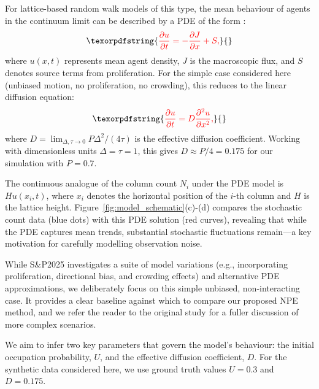 \documentclass{article}
\providecommand{\DIFdeltex}[1]{{\protect\color{red} \scriptsize #1}} %
\providecommand{\DIFdel}[1]{\texorpdfstring{\DIFdeltex{#1}}{}} %
\begin{document}
\DIFdel{For lattice-based random walk models of this type, the mean behaviour of agents in the continuum limit can be described by a PDE of the form \citep{Codling2008,Simpson2025.05.25.656057,Plank2025}:
}\begin{displaymath}
	\DIFdel{\frac{\partial u}{\partial t} = -\frac{\partial J}{\partial x} + S,
}\end{displaymath}%
\DIFdel{where $u(x,t)$ represents mean agent density, $J$ is the macroscopic flux, and $S$ denotes source terms from proliferation. For the simple case considered here (unbiased motion, no proliferation, no crowding), this reduces to the linear diffusion equation:
}\begin{displaymath}
	\DIFdel{\frac{\partial u}{\partial t} = D\frac{\partial^2 u}{\partial x^2},
}\end{displaymath}%
\DIFdel{where $D = \lim_{\Delta,\tau \to 0} P\Delta^2/(4\tau)$ is the effective diffusion coefficient. Working with dimensionless units $\Delta=\tau=1$, this gives $D \approx P/4=0.175$ for our simulation with $P=0.7$.
}%

\DIFdel{The continuous analogue of the column count $N_i$ under the PDE model is $Hu(x_i,t)$, where $x_i$ denotes the horizontal position of the $i$-th column and $H$ is the lattice height. Figure~\ref{fig:model_schematic}(c)-(d) compares the stochastic count data (blue dots) with this PDE solution (red curves), revealing that while the PDE captures mean trends, substantial stochastic fluctuations remain—a key motivation for carefully modelling observation noise.
}%

\DIFdel{While S\&P2025 investigates a suite of model variations (e.g., incorporating proliferation, directional bias, and crowding effects) and alternative PDE approximations, we deliberately focus on this simple unbiased, non-interacting case. It provides a clear baseline against which to compare our proposed NPE method, and we refer the reader to the original study for a fuller discussion of more complex scenarios.
}%

\DIFdel{We aim to infer two key parameters that govern the model's behaviour: the initial occupation probability, $U$, and the effective diffusion coefficient, $D$. For the synthetic data considered here, we use ground truth values $U=0.3$ and $D=0.175$. 
}%
\end{document}
